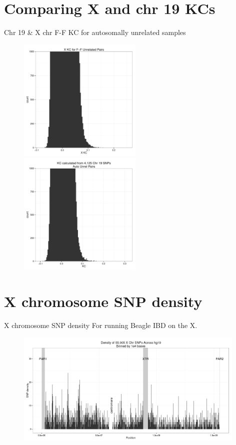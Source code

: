 \documentclass{beamer}
\begin{document}
\section[]{Comparing X and chr 19 KCs}
\begin{frame}{Chr 19 \& X chr F-F KC for autosomally unrelated samples}
\begin{figure}
\includegraphics[height=5.9cm]{../olga_update_27july2015/xkc_unrel_hist_FFpairs_trunc.pdf}
\includegraphics[height=5.9cm]{../olga_update_27july2015/kc_chr19_autounrel_hist_trunc.pdf}
\end{figure}
\end{frame}

\section[]{X chromosome SNP density}
\begin{frame}{X chromosome SNP density}
For running Beagle IBD on the X.
\begin{figure}
\includegraphics[width=11cm]{../olga_update_27july2015/chrX_density.png}
\end{figure}
\end{frame}
\end{document}
